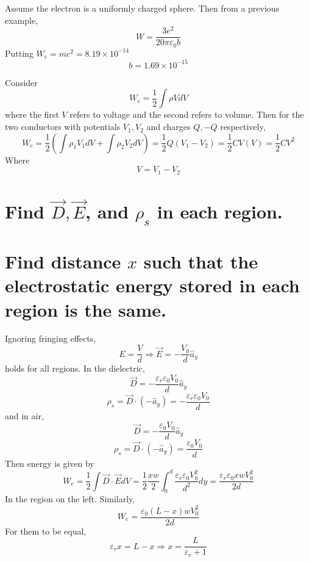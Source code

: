 \documentclass[answers]{exam}
\begin{document}
\begin{questions}

\begin{solution}
	Assume the electron is a uniformly charged sphere. Then from a previous example,
	$$W = \frac{3e^2}{20\pi\varepsilon_0b}$$
	Putting $W_e = mc^2 = 8.19\times10^{-14}$
	$$b = 1.69\times10^{-15}$$
\end{solution}


\begin{solution}
	Consider
	$$W_e = \frac{1}{2} \int \rho V dV$$
	where the first $V$ refers to voltage and the second refers to volume. Then for the two conductors with potentials $V_1,V_2$ and charges $Q,-Q$ respectively,
	$$W_e = \frac{1}{2} \left(\int \rho_1 V_1 dV + \int \rho_2 V_2 dV\right) = \frac{1}{2}Q(V_1-V_2) = \frac{1}{2}CV(V) = \frac{1}{2}CV^2$$
	Where
	$$V = V_1-V_2$$
\end{solution}


\begin{parts}
	\part{Find $\vec{D}, \vec{E}$, and $\rho_s$ in each region.}
	\part{Find distance $x$ such that the electrostatic energy stored in each region is the same.}
\end{parts}

\begin{solution}
	Ignoring fringing effects,
	$$E = \frac{V}{d} \Rightarrow \vec{E} = -\frac{V_0}{d}\hat{a}_y$$
	holds for all regions. In the dielectric,
	$$\vec{D} = -\frac{\varepsilon_r\varepsilon_0V_0}{d}\hat{a}_y$$
	$$\rho_s = \vec{D}\cdot(-\hat{a}_y) = -\frac{\varepsilon_r\varepsilon_0V_0}{d}$$
	and in air,
	$$\vec{D} = -\frac{\varepsilon_0V_0}{d}\hat{a}_y$$
	$$\rho_s = \vec{D}\cdot(-\hat{a}_y) = \frac{\varepsilon_0V_0}{d}$$
	Then energy is given by
	$$W_e = \frac{1}{2} \int \vec{D} \cdot \vec{E} dV = \frac{1}{2} \frac{xw}{2} \int_0^d \frac{\varepsilon_r\varepsilon_0V_0^2}{d^2} dy = \frac{\varepsilon_r\varepsilon_0xwV_0^2}{2d}$$
	In the region on the left. Similarly,
	$$W_e = \frac{\varepsilon_0(L-x)wV_0^2}{2d}$$
	For them to be equal,
	$$\varepsilon_rx = L-x \Rightarrow x = \frac{L}{\varepsilon_r+1}$$
\end{solution}


\end{questions}
\end{document}
